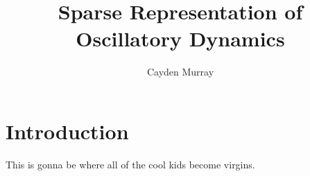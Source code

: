 \documentclass{article}
\title{Sparse Representation of Oscillatory Dynamics}
\author{Cayden Murray}
\date{}
\begin{document}
	
	\maketitle
	
	\section{Introduction}
	This is gonna be where all of the cool kids become virgins.

	
\end{document}
